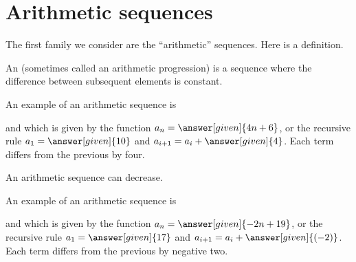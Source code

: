 \documentclass{ximera}
\begin{document}
\section{Arithmetic sequences}


The first family we consider are the ``arithmetic'' sequences.  Here
is a definition.


\begin{definition}
  An  (sometimes called an arithmetic
  progression) is a sequence where the
  difference between subsequent elements is constant.
\end{definition}


\begin{example}
  An example of an arithmetic sequence is 
  \begin{image}
  \end{image}
  and which is given by the function $a_n=\answer[given]{4n+6}$, or
  the recursive rule $a_1 = \answer[given]{10}$ and $a_{i+1} = a_i +
  \answer[given]{4}$. Each term differs from the previous by four.
\end{example}

An arithmetic sequence can decrease.

\begin{example}
  An example of an arithmetic sequence is 
  \begin{image}
  \end{image}
  and which is given by the function $a_n=\answer[given]{-2n + 19}$, or
  the recursive rule $a_1 = \answer[given]{17}$ and $a_{i+1} = a_i +
  \answer[given]{(-2)}$. Each term differs from the previous by negative
  two.
\end{example}
\end{document}

